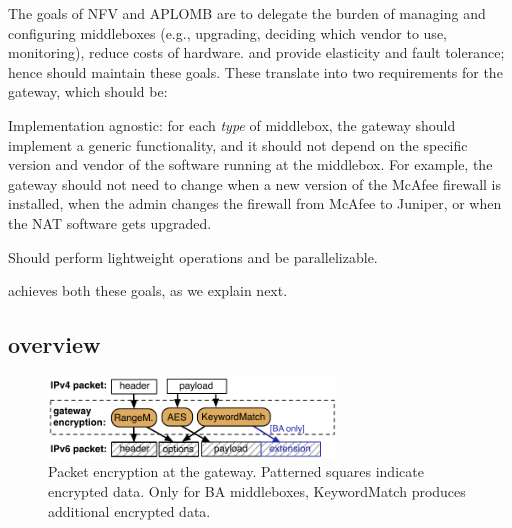 The goals of NFV and APLOMB are to delegate the burden of managing and configuring
middleboxes (e.g., upgrading, deciding which vendor to use, monitoring), reduce costs of hardware. 
and provide elasticity and fault tolerance; hence \sys should maintain these goals.
%
These translate into two  requirements for the gateway, which should be: 
\begin{CompactItemize}
\item Implementation agnostic: for each {\em type} of middlebox, the gateway should implement a generic functionality, and it should not depend on the specific version and vendor of the software running at the middlebox. For example, the gateway should not need to change when a new version of the McAfee firewall is installed, when the admin changes the firewall  from McAfee to Juniper, or when the NAT software gets upgraded. 
\item Should perform lightweight operations and be parallelizable. 

\end{CompactItemize}


\sys achieves both these goals, as we explain next.


\subsection{\sys overview}


\begin{figure}[t!]
\centering
  \includegraphics[width=3.0in]{fig/packet.pdf}
\caption{Packet encryption at the gateway. Patterned squares indicate encrypted data. Only for BA  middleboxes,  KeywordMatch produces additional encrypted data.  \label{fig:packet}}
\end{figure}





